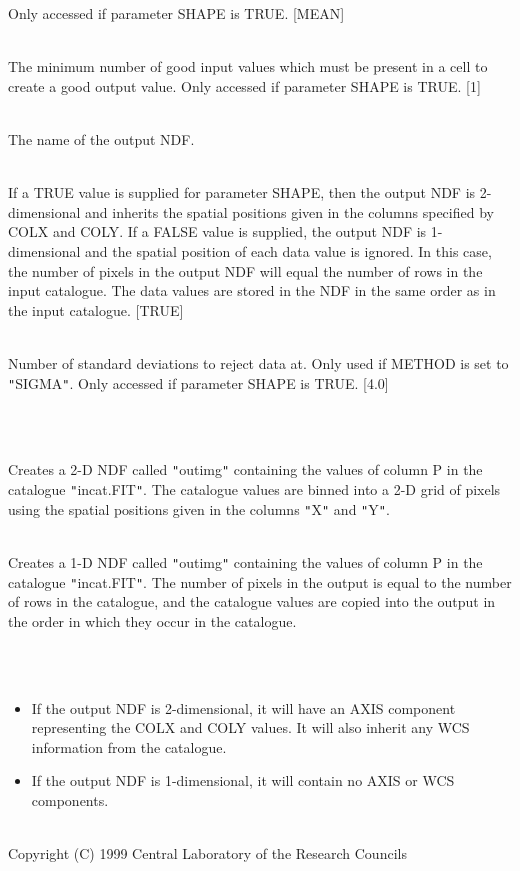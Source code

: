 \documentclass[twoside,11pt]{article}
\renewcommand{\_}{\texttt{\symbol{95}}}
\newlength{\sstexampleslength}
\newcommand{\sstexamples}[1]{
   \item[Examples:] \mbox{} \\
   \vspace{-3.5ex}
   \begin{description}
      #1
   \end{description}
}
\newcommand{\sstsubsection}[1]{ \item[{#1}] \mbox{} \\}
\newcommand{\sstexamplesubsection}[2]{\sloppy
\item[\parbox{\sstexampleslength}{\ssttt #1}] \mbox{} \vspace{1.0ex}
\\ #2 }
\newcommand{\sstnotes}[1]{\item[Notes:] \mbox{} \\[1.3ex] #1}
\newcommand{\sstdiytopic}[2]{\item[{\hspace{-0.35em}#1\hspace{-0.35em}:}]
\mbox{} \\[1.3ex] #2}
\newcommand{\sstitemlist}[1]{
  \mbox{} \\
  \vspace{-3.5ex}
  \begin{itemize}
     #1
  \end{itemize}
}
\newcommand{\sstitem}{\item}
\newcommand{\sstexamples}[1]{
      \item[Examples:] \\
      \begin{description}
         #1
      \end{description}
      \\
   }
\newcommand{\sstsubsection}[1]{\item[{#1}]}
\newcommand{\sstexamplesubsection}[2]{\item[{\ssttt #1}] #2}
\newcommand{\sstnotes}[1]{\item[Notes:] #1 }
\newcommand{\sstdiytopic}[2]{\item[{#1}] #2 }
\newcommand{\sstitemlist}[1]{
      \begin{itemize}
         #1
      \end{itemize}
      \\
   }
\newcommand{\sstitem}{\item}
\begin{document}
{{{{         }
         Only accessed if parameter SHAPE is TRUE. [MEAN]
      }
      \sstsubsection{
         MINVAL = \_INTEGER (Read)
      }{
         The minimum number of good input values which must be present in
         a cell to create a good output value. Only accessed if parameter
         SHAPE is TRUE. [1]
      }
      \sstsubsection{
         OUT = NDF (Read)
      }{
         The name of the output NDF.
      }
      \sstsubsection{
         SHAPE = \_LOGICAL (Read)
      }{
         If a TRUE value is supplied for parameter SHAPE, then the output
         NDF is 2-dimensional and inherits the spatial positions given in
         the columns specified by COLX and COLY. If a FALSE value is
         supplied, the output NDF is 1-dimensional and the spatial position
         of each data value is ignored. In this case, the number of pixels
         in the output NDF will equal the number of rows in the input
         catalogue. The data values are stored in the NDF in the same order
         as in the input catalogue. [TRUE]
      }
      \sstsubsection{
         SIGMAS = \_REAL (Read)
      }{
         Number of standard deviations to reject data at. Only used if
         METHOD is set to {\tt "}SIGMA{\tt "}. Only accessed if parameter SHAPE is
         TRUE. [4.0]
      }
   }
   \sstexamples{
      \sstexamplesubsection{
         polimage incat outimg p
      }{
         Creates a 2-D NDF called {\tt "}outimg{\tt "} containing the values of column
         P in the catalogue {\tt "}incat.FIT{\tt "}. The catalogue values are binned
         into a 2-D grid of pixels using the spatial positions given in
         the columns {\tt "}X{\tt "} and {\tt "}Y{\tt "}.
      }
      \sstexamplesubsection{
         polimage incat outimg p noshape
      }{
         Creates a 1-D NDF called {\tt "}outimg{\tt "} containing the values of column
         P in the catalogue {\tt "}incat.FIT{\tt "}. The number of pixels in the output
         is equal to the number of rows in the catalogue, and the catalogue
         values are copied into the output in the order in which they occur
         in the catalogue.
      }
   }
   \sstnotes{
      \sstitemlist{

         \sstitem
         If the output NDF is 2-dimensional, it will have an AXIS component
         representing the COLX and COLY values. It will also inherit any WCS
         information from the catalogue.

         \sstitem
         If the output NDF is 1-dimensional, it will contain no AXIS or
         WCS components.
      }
   }
   \sstdiytopic{
      Copyright
   }{
      Copyright (C) 1999 Central Laboratory of the Research Councils
   }
}
\end{document}
